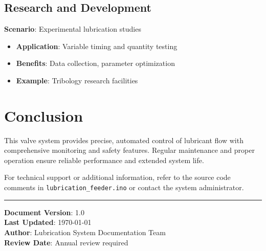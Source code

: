 \documentclass[11pt,a4paper]{article}
\newcommand{\code}[1]{\texttt{#1}}
\begin{document}
\subsection{Research and Development}
\textbf{Scenario}: Experimental lubrication studies
\begin{itemize}
    \item \textbf{Application}: Variable timing and quantity testing
    \item \textbf{Benefits}: Data collection, parameter optimization
    \item \textbf{Example}: Tribology research facilities
\end{itemize}

\section{Conclusion}

This valve system provides precise, automated control of lubricant flow with comprehensive monitoring and safety features. Regular maintenance and proper operation ensure reliable performance and extended system life.

For technical support or additional information, refer to the source code comments in \code{lubrication\_feeder.ino} or contact the system administrator.

\vspace{1cm}
\hrule
\vspace{0.5cm}

\noindent\textbf{Document Version}: 1.0 \\
\textbf{Last Updated}: \today \\
\textbf{Author}: Lubrication System Documentation Team \\
\textbf{Review Date}: Annual review required
\end{document}
